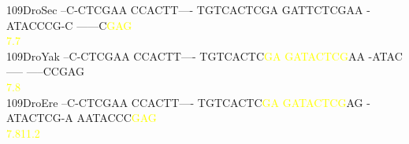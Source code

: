 \documentclass[11pt,twoside,reqno,a4paper]{article}
\begin{document}
{109\hspace*{1\charwidth}DroSec	--C-CTCGAA	CCACTT----	TGTCACTCGA	GATTCTCGAA	-ATACCCG-C	------C\textcolor{Yellow}{G}\textcolor{Yellow}{A}\textcolor{Yellow}{G}	\\
\hspace*{4\charwidth}\hspace*{7\charwidth}\hspace*{1\charwidth}\hspace*{1\charwidth}\hspace*{1\charwidth}\hspace*{1\charwidth}\hspace*{1\charwidth}\hspace*{57\charwidth}\textcolor{Yellow}{7.7}\hspace*{1\charwidth}\\
109\hspace*{1\charwidth}DroYak	--C-CTCGAA	CCACTT----	TGTCACTC\textcolor{Yellow}{G}\textcolor{Yellow}{A}	\textcolor{Yellow}{G}\textcolor{Yellow}{A}\textcolor{Yellow}{T}\textcolor{Yellow}{A}\textcolor{Yellow}{C}\textcolor{Yellow}{T}\textcolor{Yellow}{C}\textcolor{Yellow}{G}AA	-ATAC-----	-----CCGAG	\\
\hspace*{4\charwidth}\hspace*{7\charwidth}\hspace*{1\charwidth}\hspace*{1\charwidth}\hspace*{28\charwidth}\textcolor{Yellow}{7.8}\hspace*{1\charwidth}\hspace*{1\charwidth}\hspace*{1\charwidth}\hspace*{1\charwidth}\\
109\hspace*{1\charwidth}DroEre	--C-CTCGAA	CCACTT----	TGTCACTC\textcolor{Yellow}{G}\textcolor{Yellow}{A}	\textcolor{Yellow}{G}\textcolor{Yellow}{A}\textcolor{Yellow}{T}\textcolor{Yellow}{A}\textcolor{Yellow}{C}\textcolor{Yellow}{T}\textcolor{Yellow}{C}\textcolor{Yellow}{G}AG	-ATACTCG-A	AATACCC\textcolor{Yellow}{G}\textcolor{Yellow}{A}\textcolor{Yellow}{G}	\\
\hspace*{4\charwidth}\hspace*{7\charwidth}\hspace*{1\charwidth}\hspace*{1\charwidth}\hspace*{28\charwidth}\textcolor{Yellow}{7.8}\hspace*{1\charwidth}\hspace*{1\charwidth}\hspace*{1\charwidth}\hspace*{26\charwidth}\textcolor{Yellow}{11.2}\hspace*{1\charwidth}\\
}
\end{document}
